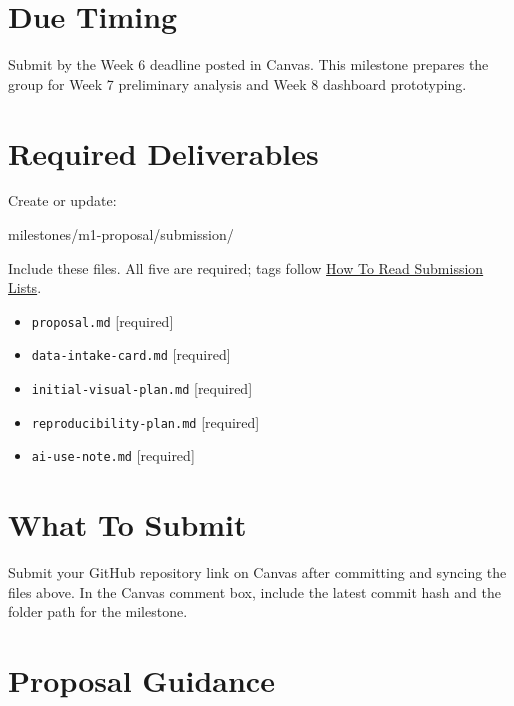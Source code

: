 \documentclass[
  letterpaper,
  DIV=11,
  numbers=noendperiod,
  oneside]{scrreprt}
\newenvironment{Shaded}{\begin{snugshade}}{\end{snugshade}}
\newcommand{\NormalTok}[1]{\textcolor[rgb]{0.00,0.23,0.31}{#1}}
\providecommand{\tightlist}{%
  \setlength{\itemsep}{0pt}\setlength{\parskip}{0pt}}
\begin{document}
\section{Due Timing}\label{due-timing-1}

Submit by the Week 6 deadline posted in Canvas. This milestone prepares
the group for Week 7 preliminary analysis and Week 8 dashboard
prototyping.

\section{Required Deliverables}\label{required-deliverables-1}

Create or update:

\begin{Shaded}
\begin{Highlighting}[numbers=left,,]
\NormalTok{milestones/m1{-}proposal/submission/}
\end{Highlighting}
\end{Shaded}

Include these files. All five are required; tags follow
\hyperref[how-to-read-submission-lists]{How To Read Submission Lists}.

\begin{itemize}
\tightlist
\item
  \texttt{proposal.md} {[}required{]}
\item
  \texttt{data-intake-card.md} {[}required{]}
\item
  \texttt{initial-visual-plan.md} {[}required{]}
\item
  \texttt{reproducibility-plan.md} {[}required{]}
\item
  \texttt{ai-use-note.md} {[}required{]}
\end{itemize}

\section{What To Submit}\label{what-to-submit-11}

Submit your GitHub repository link on Canvas after committing and
syncing the files above. In the Canvas comment box, include the latest
commit hash and the folder path for the milestone.

\section{Proposal Guidance}\label{proposal-guidance}
\end{document}
